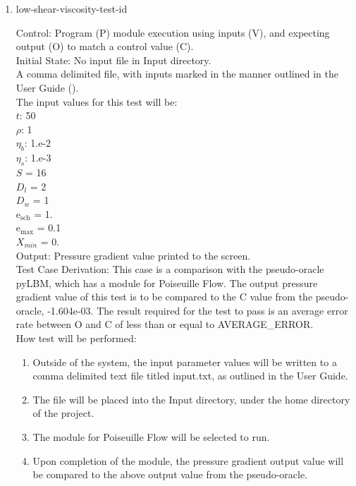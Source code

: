 \documentclass[12pt, titlepage]{article}
\newcounter{testcounter} %
\begin{document}
\begin{enumerate}
\item{low-shear-viscosity-test-id\thetestcounter \\}

Control: Program (P) module execution using inputs (V), and expecting output (O) to match a control value (C).\\
					
Initial State: No input file in Input directory.\\
					
A comma delimited file, with inputs marked in the manner outlined in the User Guide (\citet{LBM_UserGuide_PM}).\\The input values for this test will be:\\
$t$: 50\\
$\rho$: 1\\
$\eta_b$: 1.e-2\\
$\eta_s$: 1.e-3\\
$S$ = 16\\
$D_{l}$ = 2\\
$D_{w}$ = 1\\
$\mathrm{e_{sch}}$ = 1.\\
$\mathrm{e_{max}}$ = 0.1\\
$X_{min}$ = 0.\\

					
Output: Pressure gradient value printed to the screen. \\ 

Test Case Derivation: This case is a comparison with the pseudo-oracle pyLBM, which has a module for Poiseuille Flow. The output pressure gradient value of this test is to be compared to the C value from the pseudo-oracle, -1.604e-03. The result required for the test to pass is an average error rate between O and C of less than or equal to AVERAGE\_ERROR.\\

					
How test will be performed: 

\begin{enumerate}
\item Outside of the system, the input parameter values will be written to a comma delimited text file titled input.txt, as outlined in the User Guide.
\item The file will be placed into the Input directory, under the home directory of the project.
\item The module for Poiseuille Flow will be selected to run.
\item Upon completion of the module, the pressure gradient output value will be compared to the above output value from the pseudo-oracle.
\end{enumerate}	


\end{enumerate}
\end{document}
